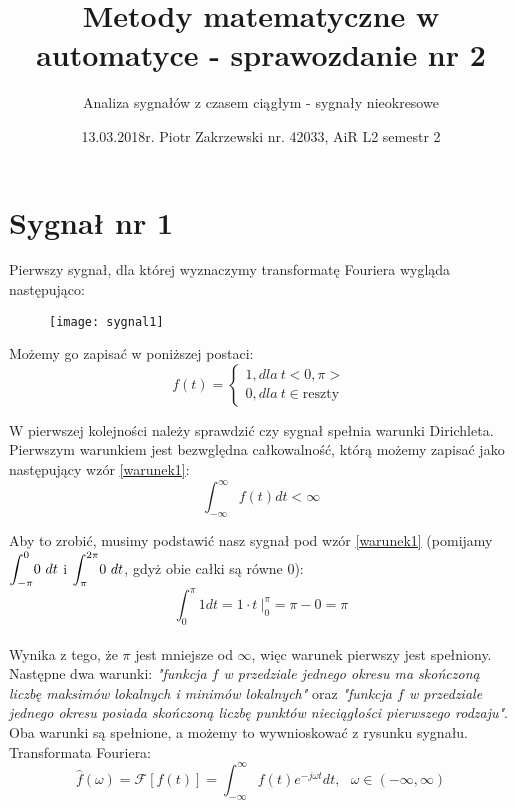 \documentclass[11pt,a4paper]{article}
\title{Metody matematyczne w automatyce - sprawozdanie nr 2}
\author{Analiza sygnałów z czasem ciągłym - sygnały nieokresowe}
\date{13.03.2018r. Piotr Zakrzewski nr. 42033, AiR L2 semestr 2}
\numberwithin{liczba1}{liczba2}
\begin{document}
\maketitle
\section{Sygnał nr 1}

Pierwszy sygnał, dla której wyznaczymy transformatę Fouriera wygląda następująco:
\begin{figure}[h]
\centering
\texttt{[image: sygnal1]}
\end{figure}

Możemy go zapisać w poniższej postaci:
\[
    f(t) =\left\{
                \begin{array}{ll}
                  1, dla\ t <0,\pi> \\
                  0, dla\ t \in \text{reszty}
                \end{array}
\label{sygnal1klamra}
\tag{1.1}
              \right.
\]

W pierwszej kolejności należy sprawdzić czy sygnał spełnia warunki Dirichleta. Pierwszym warunkiem jest bezwględna całkowalność, którą możemy zapisać jako następujący wzór \ref{warunek1}: \\
\begin{equation}
\int_{-\infty}^{\infty} f(t) dt < \infty
\label{warunek1}
\end{equation}
\pagebreak

Aby to zrobić, musimy podstawić nasz sygnał pod wzór \ref{warunek1} (pomijamy $ \mathlarger{\int_{-\pi}^{0}} 0 \ dt $ i $ \mathlarger{\int_{\pi}^{2\pi}} 0 \ dt $, gdyż obie całki są równe 0): \\
\begin{equation}
\int_{0}^{\pi} 1 dt = 1 \cdot t \ \Bigg|^\pi_0 = \pi - 0 = \pi
\end{equation} \\

Wynika z tego, że $ \pi $ jest mniejsze od $ \infty $, więc warunek pierwszy jest spełniony. Następne dwa warunki: \textit{"funkcja $ f $ w przedziale jednego okresu ma skończoną liczbę maksimów lokalnych i minimów lokalnych"} oraz \textit{"funkcja $ f $ w przedziale jednego okresu posiada skończoną liczbę punktów nieciągłości pierwszego rodzaju"}. Oba warunki są spełnione, a możemy to wywnioskować z rysunku sygnału. \\

Transformata Fouriera: \\
\begin{equation}
\hat{f} (\omega) = \mathcal{F}[f(t)] = \int_{-\infty}^{\infty} f(t) e^{-j \omega t} dt, \ \ \ \omega \in (-\infty,\infty)
\label{transformata}
\end{equation}
\end{document}
